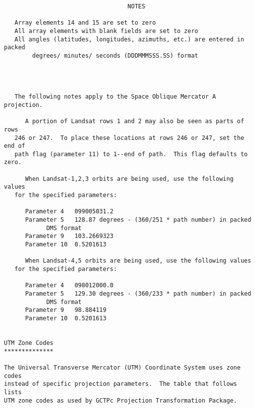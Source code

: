 \begin{verbatim}
                                   NOTES

   Array elements 14 and 15 are set to zero
   All array elements with blank fields are set to zero
   All angles (latitudes, longitudes, azimuths, etc.) are entered in packed
        degrees/ minutes/ seconds (DDDMMMSSS.SS) format




   The following notes apply to the Space Oblique Mercator A projection.

      A portion of Landsat rows 1 and 2 may also be seen as parts of rows
   246 or 247.  To place these locations at rows 246 or 247, set the end of
   path flag (parameter 11) to 1--end of path.  This flag defaults to zero.

      When Landsat-1,2,3 orbits are being used, use the following values
   for the specified parameters:

      Parameter 4   099005031.2
      Parameter 5   128.87 degrees - (360/251 * path number) in packed
		    DMS format
      Parameter 9   103.2669323
      Parameter 10  0.5201613

      When Landsat-4,5 orbits are being used, use the following values
   for the specified parameters:

      Parameter 4   098012000.0
      Parameter 5   129.30 degrees - (360/233 * path number) in packed
		    DMS format
      Parameter 9   98.884119
      Parameter 10  0.5201613


UTM Zone Codes
**************

The Universal Transverse Mercator (UTM) Coordinate System uses zone codes 
instead of specific projection parameters.  The table that follows lists 
UTM zone codes as used by GCTPc Projection Transformation Package.



\end{verbatim}
